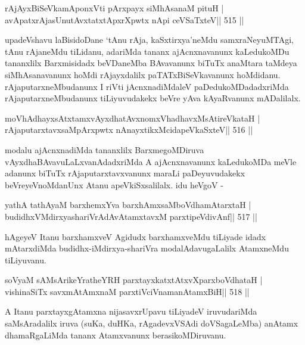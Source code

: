 \begin{shl}
rAjAyxBiSeVkamAponxVti pArxpayx siMhAsanaM pituH |
avApatxrAjasUnutAvxtatxtApxrXpwtx nApi ceVSaTxteV\hfill || 515 ||
\end{shl}

\begin{artha}
upadeVshavu laBisidoDane `tAnu rAja, kaSxtirxya'neMdu samxraNeyuMTAgi,
tAnu rAjaneMdu tiLidanu, adariMda tananx ajAcnxnavanunx kaLedukoMDu
tananxlilx Barxmisidadx beVDaneMba BAvavanunx biTuTx anaMtara taMdeya
siMhAsanavanunx hoMdi rAjayxdalilx paTATxBiSeVkavanunx
hoMdidanu. rAjaputarxneMbudanunx I riVti jAcnxnadiMdaleV
paDedukoMDadadxriMda rAjaputarxneMbudanunx tiLiyuvudakekx
beVre yAva kAyaRvanunx mADalilalx.
\end{artha}

\begin{shl}
moVhAdhayxsAtxtamxvAyxdhatAvxnomxVhadhavxMsAtireVkataH |
rAjaputarxtavxsaMpArxpwtx nAnayxtikxMcidapeVkaSxteV\hfill || 516 ||
\end{shl}

\begin{artha}
modalu ajAcnxnadiMda tananxlilx BarxmegoMDiruva
vAyxdhaBAvavuLaLxvanAdadxriMda A ajAcnxnavanunx kaLedukoMDa meVle
adanunx biTuTx rAjaputarxtavxvanunx maraLi paDeyuvudakekx
beVreyeVnoMdanUnx Atanu apeVkiSxsalilalx. idu heVgoV -
\end{artha}

\begin{shl}
yathA tathA\s yaM barxhemxYva barxhAmxsaMboVdhamAtarxtaH |
budidhxVMdirxyashariVrAdAvAtamxtavxM parxtipeVdivAnf\hfill || 517 ||
\end{shl}

\begin{artha}
hAgeyeV Itanu barxhamxveV Agidudx barxhamxveMdu tiLiyade
idadx mAtarxdiMda budidhx-iMdirxya-shariVra modalAdavugaLalilx
AtamxneMdu tiLiyuvanu.
\end{artha}


\begin{shl}
soV\s yaM sAMsArikeYratheYRH parxtayxkatxtAtxvXparxboVdhataH |
vishinaSiTx savxmAtAmxnaM parxtiVciVnamanAtamxBiH\hfill || 518 ||
\end{shl}

\begin{artha}
A Itanu parxtayxgAtamxna nijasavxrUpavu tiLiyadeV iruvudariMda saMsAradalilx iruva (suKa, duHKa, rAgadevxVSAdi doVSagaLeMba) anAtamx dhamaRgaLiMda tananx Atamxvanunx berasikoMDiruvanu.
\end{artha}

